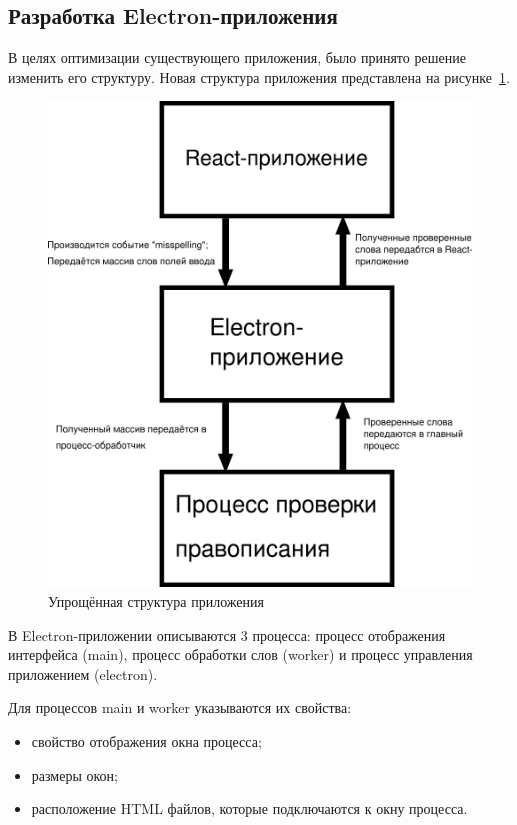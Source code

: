 \subsection{Разработка Electron-приложения}

В целях оптимизации существующего приложения, было принято решение изменить его структуру. Новая структура приложения представлена на рисунке~\ref{img:minStruct}.

\begin{figure}[H]
  \centering
  \includegraphics[height=0.3\textheight]{assets/images/practical/struct.png}
  \caption{Упрощённая структура приложения}
  \label{img:minStruct}
\end{figure}

В Electron-приложении описываются 3 процесса: процесс отображения интерфейса (main), процесс обработки слов (worker) и процесс управления приложением (electron).

Для процессов main и worker указываются их свойства:

\begin{itemize}
  \item свойство отображения окна процесса;
  \item размеры окон;
  \item расположение HTML файлов, которые подключаются к окну процесса.
\end{itemize}

